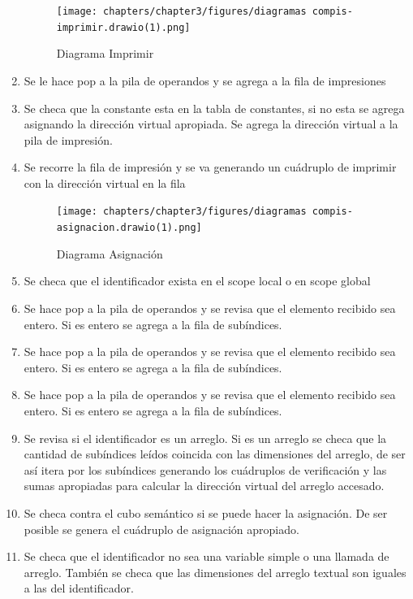 \begin{enumerate}
    \newpage
    
    \begin{figure}[!htbp]
            \centering
            \texttt{[image: chapters/chapter3/figures/diagramas compis-imprimir.drawio(1).png]}
            \caption{Diagrama Imprimir}
            \label{fig:my_label}
    \end{figure}
    \FloatBarrier
    
    \item Se le hace pop a la pila de operandos y se agrega a la fila de impresiones
    \item Se checa que la constante esta en la tabla de constantes, si no esta se agrega asignando la dirección virtual apropiada. Se agrega la dirección virtual a la pila de impresión.
    \item Se recorre la fila de impresión y se va generando un cuádruplo de imprimir con la dirección virtual en la fila
    
    \newpage
    
    \begin{figure}[!htbp]
            \centering
            \texttt{[image: chapters/chapter3/figures/diagramas compis-asignacion.drawio(1).png]}
            \caption{Diagrama Asignación}
            \label{fig:my_label}
    \end{figure}
    \FloatBarrier
    
    \item Se checa que el identificador exista en el scope local o en scope global
    \item Se hace pop a la pila de operandos y se revisa que el elemento recibido sea entero. Si es entero se agrega a la fila de subíndices.
    \item Se hace pop a la pila de operandos y se revisa que el elemento recibido sea entero. Si es entero se agrega a la fila de subíndices.
    \item Se hace pop a la pila de operandos y se revisa que el elemento recibido sea entero. Si es entero se agrega a la fila de subíndices.
    \item Se revisa si el identificador es un arreglo. Si es un arreglo se checa que la cantidad de subíndices leídos coincida con las dimensiones del arreglo, de ser así itera por los subíndices generando los cuádruplos de verificación y las sumas apropiadas para calcular la dirección virtual del arreglo accesado.
    \item Se checa contra el cubo semántico si se puede hacer la asignación. De ser posible se genera el cuádruplo de asignación apropiado.
    \item Se checa que el identificador no sea una variable simple o una llamada de arreglo. También se checa que las dimensiones del arreglo textual son iguales a las del identificador.
    

\end{enumerate}

